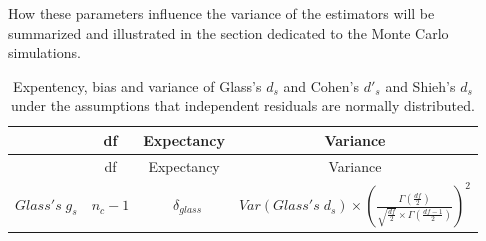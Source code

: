 \documentclass[
  man,floatsintext]{apa6}
\begin{document}
How these parameters influence the variance of the estimators will be summarized and illustrated in the section dedicated to the Monte Carlo simulations.

\newpage
\begin{landscape}

\begin{longtable}[]{@{}lccc@{}}
\caption{Expentency, bias and variance of Glass's \(d_s\) and Cohen's \(d'_s\) and Shieh's \(d_s\) under the assumptions that independent residuals are normally distributed.}\tabularnewline
\toprule
\begin{minipage}[b]{0.10\columnwidth}\raggedright
\strut
\end{minipage} & \begin{minipage}[b]{0.18\columnwidth}\centering
df\strut
\end{minipage} & \begin{minipage}[b]{0.16\columnwidth}\centering
Expectancy\strut
\end{minipage} & \begin{minipage}[b]{0.45\columnwidth}\centering
Variance\strut
\end{minipage}\tabularnewline
\midrule
\endfirsthead
\toprule
\begin{minipage}[b]{0.10\columnwidth}\raggedright
\strut
\end{minipage} & \begin{minipage}[b]{0.18\columnwidth}\centering
df\strut
\end{minipage} & \begin{minipage}[b]{0.16\columnwidth}\centering
Expectancy\strut
\end{minipage} & \begin{minipage}[b]{0.45\columnwidth}\centering
Variance\strut
\end{minipage}\tabularnewline
\midrule
\endhead
\begin{minipage}[t]{0.10\columnwidth}\raggedright
\(Glass's \; g_s\)\strut
\end{minipage} & \begin{minipage}[t]{0.18\columnwidth}\centering
\(n_c-1\)\strut
\end{minipage} & \begin{minipage}[t]{0.16\columnwidth}\centering
~\(\delta_{glass}\)\strut
\end{minipage} & \begin{minipage}[t]{0.45\columnwidth}\centering
\(Var(Glass's \; d_s) \times \left( \frac{\Gamma\left(\frac{df}{2} \right)}{\sqrt{\frac{df}{2}} \times \Gamma \left( \frac{df-1}{2}\right)}\right)^2\)\strut

\end{minipage}
\end{longtable}
\end{landscape}
\end{document}
